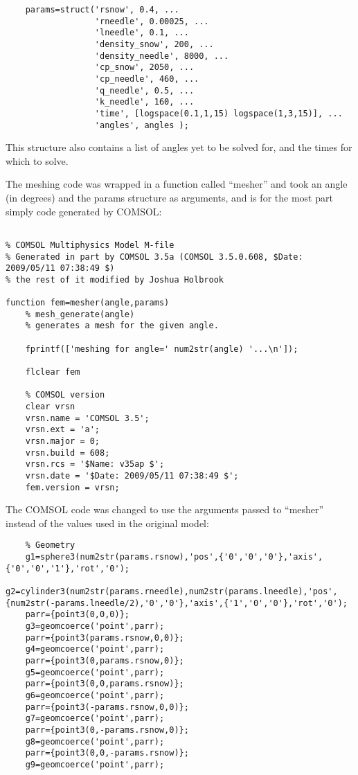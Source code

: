 \small
\begin{verbatim}
    params=struct('rsnow', 0.4, ...
                  'rneedle', 0.00025, ...
                  'lneedle', 0.1, ...
                  'density_snow', 200, ...
                  'density_needle', 8000, ...
                  'cp_snow', 2050, ...
                  'cp_needle', 460, ...
                  'q_needle', 0.5, ...
                  'k_needle', 160, ...
                  'time', [logspace(0.1,1,15) logspace(1,3,15)], ...
                  'angles', angles );
\end{verbatim}
\normalsize

This structure also contains a list of angles yet to be solved for, and the
times for which to solve.

The meshing code was wrapped in a function called ``mesher'' and took an angle
(in degrees) and the params structure as arguments, and is for the most part
simply code generated by COMSOL:

\small
\begin{verbatim}

% COMSOL Multiphysics Model M-file
% Generated in part by COMSOL 3.5a (COMSOL 3.5.0.608, $Date: 2009/05/11 07:38:49 $)
% the rest of it modified by Joshua Holbrook

function fem=mesher(angle,params)
    % mesh_generate(angle)
    % generates a mesh for the given angle. 

    fprintf(['meshing for angle=' num2str(angle) '...\n']);

    flclear fem

    % COMSOL version
    clear vrsn
    vrsn.name = 'COMSOL 3.5';
    vrsn.ext = 'a';
    vrsn.major = 0;
    vrsn.build = 608;
    vrsn.rcs = '$Name: v35ap $';
    vrsn.date = '$Date: 2009/05/11 07:38:49 $';
    fem.version = vrsn;
\end{verbatim}
\normalsize

The COMSOL code was changed to use the arguments passed to ``mesher'' instead of
the values used in the original model:

\small
\begin{verbatim}
    % Geometry
    g1=sphere3(num2str(params.rsnow),'pos',{'0','0','0'},'axis',{'0','0','1'},'rot','0');
    g2=cylinder3(num2str(params.rneedle),num2str(params.lneedle),'pos',{num2str(-params.lneedle/2),'0','0'},'axis',{'1','0','0'},'rot','0');
    parr={point3(0,0,0)};
    g3=geomcoerce('point',parr);
    parr={point3(params.rsnow,0,0)};
    g4=geomcoerce('point',parr);
    parr={point3(0,params.rsnow,0)};
    g5=geomcoerce('point',parr);
    parr={point3(0,0,params.rsnow)};
    g6=geomcoerce('point',parr);
    parr={point3(-params.rsnow,0,0)};
    g7=geomcoerce('point',parr);
    parr={point3(0,-params.rsnow,0)};
    g8=geomcoerce('point',parr);
    parr={point3(0,0,-params.rsnow)};
    g9=geomcoerce('point',parr);
\end{verbatim}
\normalsize

